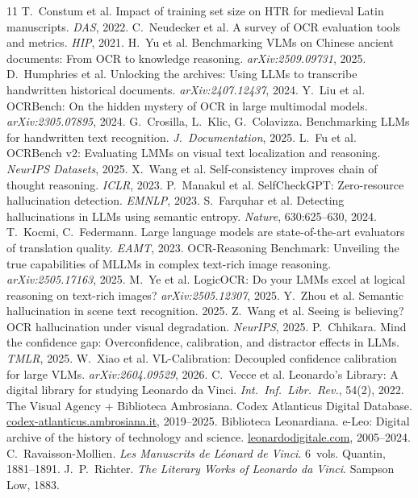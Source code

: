 \documentclass[10pt,twocolumn]{article}
\begin{document}
\vspace{-0.5em}
{\scriptsize

\begin{thebibliography}{11}
\setlength{\itemsep}{-1pt}
 T.~Constum et al. Impact of training set size on HTR for medieval Latin manuscripts. \emph{DAS}, 2022.
 C.~Neudecker et al. A survey of OCR evaluation tools and metrics. \emph{HIP}, 2021.
 H.~Yu et al. Benchmarking VLMs on Chinese ancient documents: From OCR to knowledge reasoning. \emph{arXiv:2509.09731}, 2025.
 D.~Humphries et al. Unlocking the archives: Using LLMs to transcribe handwritten historical documents. \emph{arXiv:2407.12437}, 2024.
 Y.~Liu et al. OCRBench: On the hidden mystery of OCR in large multimodal models. \emph{arXiv:2305.07895}, 2024.
 G.~Crosilla, L.~Klic, G.~Colavizza. Benchmarking LLMs for handwritten text recognition. \emph{J.\ Documentation}, 2025.
 L.~Fu et al. OCRBench v2: Evaluating LMMs on visual text localization and reasoning. \emph{NeurIPS Datasets}, 2025.
 X.~Wang et al. Self-consistency improves chain of thought reasoning. \emph{ICLR}, 2023.
 P.~Manakul et al. SelfCheckGPT: Zero-resource hallucination detection. \emph{EMNLP}, 2023.
 S.~Farquhar et al. Detecting hallucinations in LLMs using semantic entropy. \emph{Nature}, 630:625--630, 2024.
 T.~Kocmi, C.~Federmann. Large language models are state-of-the-art evaluators of translation quality. \emph{EAMT}, 2023.
 OCR-Reasoning Benchmark: Unveiling the true capabilities of MLLMs in complex text-rich image reasoning. \emph{arXiv:2505.17163}, 2025.
 M.~Ye et al. LogicOCR: Do your LMMs excel at logical reasoning on text-rich images? \emph{arXiv:2505.12307}, 2025.
 Y.~Zhou et al. Semantic hallucination in scene text recognition. 2025.
 Z.~Wang et al. Seeing is believing? OCR hallucination under visual degradation. \emph{NeurIPS}, 2025.
 P.~Chhikara. Mind the confidence gap: Overconfidence, calibration, and distractor effects in LLMs. \emph{TMLR}, 2025.
 W.~Xiao et al. VL-Calibration: Decoupled confidence calibration for large VLMs. \emph{arXiv:2604.09529}, 2026.
 C.~Vecce et al. Leonardo's Library: A digital library for studying Leonardo da Vinci. \emph{Int.\ Inf.\ Libr.\ Rev.}, 54(2), 2022.
 The Visual Agency + Biblioteca Ambrosiana. Codex Atlanticus Digital Database. \url{codex-atlanticus.ambrosiana.it}, 2019--2025.
 Biblioteca Leonardiana. e-Leo: Digital archive of the history of technology and science. \url{leonardodigitale.com}, 2005--2024.
 C.~Ravaisson-Mollien. \emph{Les Manuscrits de L\'eonard de Vinci}. 6~vols. Quantin, 1881--1891.
 J.~P.~Richter. \emph{The Literary Works of Leonardo da Vinci}. Sampson Low, 1883.
\end{thebibliography}
}
\end{document}
